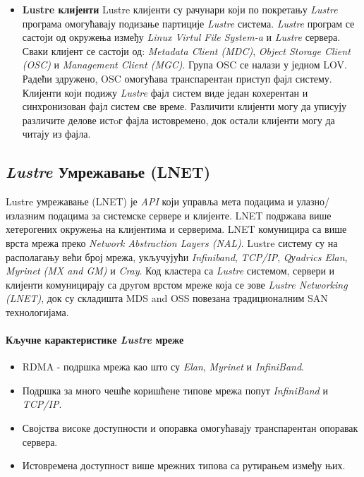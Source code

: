 \begin{itemize}
\item 
\textbf{Lustre клијенти} 
 Lustre клијенти су рачунари који по покретању \textit{Lustre} програма омогућавају подизање партиције \textit{Lustre} система. \textit{Lustre} програм се састоји од окружења између \textit{Linux Virtul File System-a} и \textit{Lustre} сервера. Сваки клијент се састоји од: \textit{Metadata Client (\gls{MDC})}, \textit{Object Storage Client (\gls{OSC})} и \textit{Management Client (\gls{MGC})}. Група OSC се налази у једном LOV. Радећи здружено, OSC  омогућава  транспарентан приступ фајл систему. Клијенти који подижу \textit{Lustre} фајл систем виде један кохерентан и синхронизован фајл систем све време. Различити клијенти могу да уписују различите делове истoг фајла истовремено, док остали клијенти могу да читају из фајла.
\end{itemize}

\subsection{\textit{Lustre} Умрежавање (\gls{LNET})}

Lustre умрежавање (LNET) је \textit{\gls{API}} који управља мета подацима и улазно/излазним подацима за системске сервере и клијенте. LNET подржава више хетерогених окружења на клијентима и серверима. LNET комуницира са више врста мрежа преко \textit{Network Abstraction Layers (\gls{NAL})}. Lustre систему су на располагању већи број мрежа, укључујући \textit{Infiniband}, \textit{TCP/IP}, \textit{Qуadrics Elan}, \textit{Myrinet (MX and GM)} и \textit{Cray}.  Код кластера са \textit{Lustre} системом, сервери и клијенти комуницирају са дрyгом врстом мреже која се зове \textit{Lustre Networking (LNET)}, док су складишта MDS and OSS повезана традиционалним SAN технологијама.

\paragraph*{Кључне карактеристике \textit{Lustre} мреже}
\begin{itemize}
\item
RDMA - подршка мрежа као што су \textit{Elan}, \textit{Myrinet} и \textit{InfiniBand}.

\item
Подршка за много чешће коришћене типове мрежа попут \textit{InfiniBand} и \textit{TCP/IP}.

\item
Својства високе доступности и опоравка омогућавају транспарентан опоравак сервера.

\item
Истовремена доступност више мрежних типова са рутирањем између њих.
\end{itemize}

